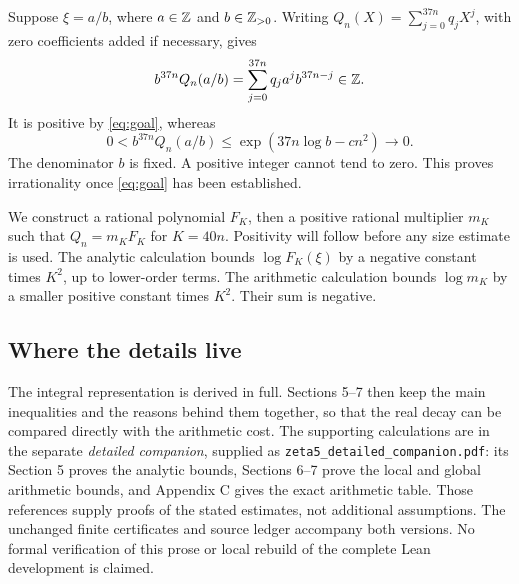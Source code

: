 Suppose \(\xi=a/b\), where \(a\in\mathbb Z\) and \(b\in\mathbb Z_{>0}\).
Writing \(Q_n(X)=\sum_{j=0}^{37n}q_jX^j\), with zero coefficients added
if necessary, gives
\[
 b^{37n}Q_n(a/b)=\sum_{j=0}^{37n}q_j a^j b^{37n-j}\in\mathbb Z.
\]
It is positive by \eqref{eq:goal}, whereas
\[
 0<b^{37n}Q_n(a/b)
 \leq\exp(37n\log b-cn^2)\longrightarrow0.
\]
The denominator \(b\) is fixed. A positive integer cannot tend to zero.
This proves irrationality once \eqref{eq:goal} has been established.

We construct a rational polynomial \(F_K\), then a positive rational
multiplier \(m_K\) such that \(Q_n=m_KF_K\) for \(K=40n\).
Positivity will follow before any size estimate is used.
The analytic calculation bounds \(\log F_K(\xi)\) by a negative
constant times \(K^2\), up to lower-order terms.
The arithmetic calculation bounds \(\log m_K\) by a smaller positive
constant times \(K^2\). Their sum is negative.

\subsection{Where the details live}

The integral representation is derived in full. Sections 5--7 then keep
the main inequalities and the reasons behind them together, so that
the real decay can be compared directly with the arithmetic cost.
The supporting calculations are in the separate
\emph{detailed companion}, supplied as
\texttt{zeta5\_detailed\_companion.pdf}: its Section 5 proves the analytic
bounds, Sections 6--7 prove the local and global arithmetic bounds,
and Appendix C gives the exact arithmetic table.
Those references supply proofs of the stated estimates, not additional
assumptions. The unchanged finite certificates and source ledger accompany
both versions. No formal verification of this prose or local rebuild of
the complete Lean development is claimed.

